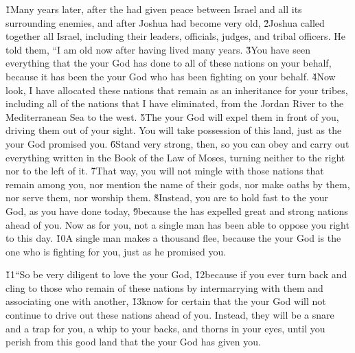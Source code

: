 \v{1}Many years later, after the  had given peace between Israel and all its surrounding enemies, and after Joshua had become very old, \v{2}Joshua called together all Israel, including their leaders, officials, judges, and tribal officers. He told them, ``I am old now after having lived many years. \v{3}You have seen everything that the  your God has done to all of these nations on your behalf, because it has been the  your God who has been fighting on your behalf. \v{4}Now look, I have allocated these nations that remain as an inheritance for your tribes, including all of the nations that I have eliminated, from the Jordan River to the Mediterranean Sea to the west. \v{5}The  your God will expel them in front of you, driving them out of your sight. You will take possession of this land, just as the  your God promised you. \v{6}Stand very strong, then, so you can obey and carry out everything written in the Book of the Law of Moses, turning neither to the right nor to the left of it. \v{7}That way, you will not mingle with those nations that remain among you, nor mention the name of their gods, nor make oaths by them, nor serve them, nor worship them. \v{8}Instead, you are to hold fast to the  your God, as you have done today, \v{9}because the  has expelled great and strong nations ahead of you. Now as for you, not a single man has been able to oppose you right to this day. \v{10}A single man makes a thousand flee, because the  your God is the one who is fighting for you, just as he promised you.

\v{11}``So be very diligent to love the  your God, \v{12}because if you ever turn back and cling to those who remain of these nations by intermarrying with them and associating one with another, \v{13}know for certain that the  your God will not continue to drive out these nations ahead of you. Instead, they will be a snare and a trap for you, a whip to your backs, and thorns in your eyes, until you perish from this good land that the  your God has given you.

